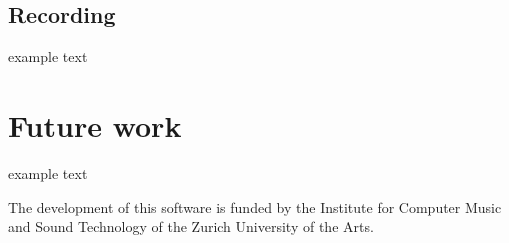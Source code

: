 \documentclass{article}
\begin{document}
\subsection{Recording}\label{sec:recording}
example text

\section{Future work}\label{sec:future_work}
example text


\begin{acknowledgments}
The development of this software is funded by the Institute for Computer Music and Sound Technology of the Zurich University of the Arts.
\end{acknowledgments} 

% 
\printbibliography
\end{document}

